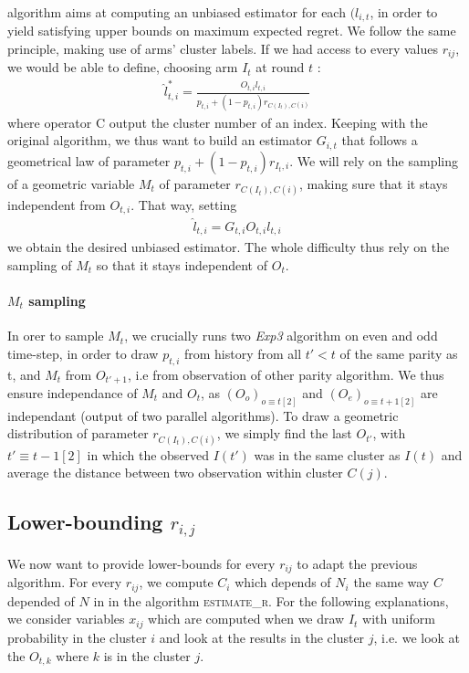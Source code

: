 \documentclass[11pt,a4paper]{article}
\begin{document}
\paragraph{}\cite{valko} algorithm aims at computing an unbiased estimator for each $(l_{i,t}$, in order to yield satisfying upper bounds on maximum expected regret. We follow the same principle, making use of arms' cluster labels. If we had access to every values $r_{ij}$, we would be able to define, choosing arm $I_t$ at round $t$ :
\begin{align*}
\hat{l}_{t,i}^{*} = \frac{O_{t,i}l_{t,i}}{p_{t,i}+(1-p_{t,i})r_{C(I_t),C(i)}}
\end{align*}
where operator C output the cluster number of an index.
Keeping with the original algorithm, we thus want to build an estimator $G_{i,t}$ that follows a geometrical law of parameter $p_{t,i}+(1-p_{t,i})r_{I_t,i}$. We will rely on the sampling of a geometric variable $M_t$ of parameter $r_{C(I_t),C(i)}$, making sure that it stays independent from $O_{t,i}$. That way, setting
\begin{align*}
\hat{l}_{t,i}=G_{t,i}O_{t,i}l_{t,i}
\end{align*}
we obtain the desired unbiased estimator. The whole difficulty thus rely on the sampling of $M_t$ so that it stays independent of $O_t$.

\paragraph{$M_t$ sampling}In orer to sample $M_t$, we crucially runs two \textit{Exp3} algorithm on even and odd time-step,
 in order to draw $p_{t,i}$ from history from all $t' < t$ of the same parity as t,
  and $M_t$ from $O_{t'+1}$, i.e from observation of other parity algorithm.
  We thus ensure independance of $M_t$ and $O_t$, as $(O_o)_{o \equiv t [2]}$ and $(O_e)_{o \equiv t+1 [2]}$ are independant (output of two parallel algorithms). To draw a geometric distribution of parameter $r_{C(I_t),C(i)}$, we simply find the last $O_{t'}$, with $t' \equiv t -1 [2]$ in which the observed $I(t')$ was in the same cluster as $I(t)$ and average the distance between two observation within cluster $C(j)$.


\subsection{Lower-bounding $r_{i,j}$}
\paragraph{}We now want to provide lower-bounds for every $r_{ij}$ to adapt the previous algorithm. For every $r_{ij}$, we compute $C_i$ which depends of $N_i$ the same way $C$ depended of $N$ in \cite{valko} in the algorithm \textsc{estimate\_r}. For the following explanations, we consider variables $x_{ij}$ which are computed when we draw $I_t$ with uniform probability in the cluster $i$ and look at the results in the cluster $j$, i.e. we look at the $O_{t,k}$ where $k$ is in the cluster $j$.
\end{document}
